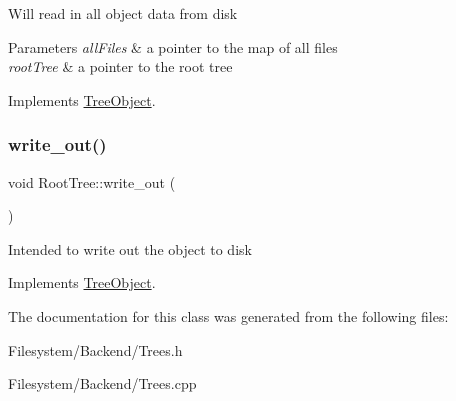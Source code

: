 Will read in all object data from disk 
\begin{DoxyParams}{Parameters}
{\em all\+Files} & a pointer to the map of all files \\
\hline
{\em root\+Tree} & a pointer to the root tree \\
\hline
\end{DoxyParams}


Implements \mbox{\hyperlink{classTreeObject_a722eb00e6782626281afc8eff92840a4}{Tree\+Object}}.

\mbox{\label{classRootTree_ad6eefe5d46ee37b3725799897a78c2dd}} 
\subsubsection{\texorpdfstring{write\+\_\+out()}{write\_out()}}
{\footnotesize\ttfamily void Root\+Tree\+::write\+\_\+out (\begin{DoxyParamCaption}{ }\end{DoxyParamCaption})\hspace{0.3cm}{\ttfamily [virtual]}}

Intended to write out the object to disk 

Implements \mbox{\hyperlink{classTreeObject_a63708d61353d83e3e03597394bb7aca0}{Tree\+Object}}.



The documentation for this class was generated from the following files\+:\begin{DoxyCompactItemize}
\item 
Filesystem/\+Backend/Trees.\+h\item 
Filesystem/\+Backend/Trees.\+cpp\end{DoxyCompactItemize}
